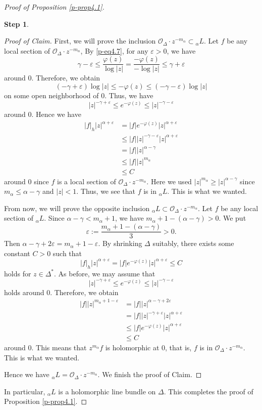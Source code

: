 \documentclass[12pt,twoside]{amsart}
\theoremstyle{definition}
\newtheorem{step}{Step}
\begin{document}
\begin{proof}[Proof of Proposition \ref{p-prop4.1}]
\begin{step}
\begin{proof}[Proof of Claim]
First, we will prove the inclusion $\mathcal O_\Delta\cdot z^{-m_\alpha} \subset 
{}_\alpha L$. 
Let $f$ be any local section of $\mathcal O_\Delta\cdot z^{-m_\alpha}$, 
By \eqref{p-eq4.7}, for any $\varepsilon >0$, 
we have 
\[
\gamma -\varepsilon \leq \frac{\varphi(z)}{\log |z|} =
\frac{-\varphi(z)}{-\log |z|} \leq \gamma +\varepsilon 
\] 
around $0$. 
Therefore, we obtain 
\[
(-\gamma +\varepsilon) \log |z| \leq -\varphi(z) 
\leq (-\gamma -\varepsilon) \log |z|
\] 
on some open neighborhood of $0$. 
Thus, we have 
\[
|z|^{-\gamma +\varepsilon} \leq e^{-\varphi(z)} \leq |z|^{-\gamma -\varepsilon}
\] 
around $0$. 
Hence we have 
\[
\begin{split}
|f|_h |z|^{\alpha +\varepsilon} &=|f| e^{-\varphi(z)} |z|^{\alpha +\varepsilon} 
\\ & \leq |f| |z|^{-\gamma -\varepsilon} |z| ^{\alpha +\varepsilon} \\ 
&= |f| |z|^{\alpha -\gamma} \\ 
&\leq |f| |z|^{m_\alpha} \\&\leq C
\end{split} 
\] 
around $0$ since $f$ is a local section of $\mathcal O_\Delta\cdot 
z^{-m_\alpha}$. Here we used 
$|z|^{m_\alpha} \geq |z|^{\alpha -\gamma}$ since $m_\alpha 
\leq \alpha -\gamma$ and $|z|<1$. 
Thus, we see that $f$ is in ${}_\alpha L$. This is what we wanted. 

From now, we will prove the opposite inclusion 
${}_\alpha L\subset \mathcal O_\Delta\cdot z^{-m_\alpha}$. 
Let $f$ be any local section of ${}_\alpha L$. 
Since $\alpha -\gamma <m_\alpha +1$, 
we have 
$m_\alpha +1-(\alpha -\gamma) >0$. We put 
\[
\varepsilon :=\frac{m_\alpha +1-(\alpha -\gamma)}{3}>0. 
\] 
Then $\alpha -\gamma +2\varepsilon =m_\alpha +1-\varepsilon$. 
By shrinking $\Delta$ suitably, 
there exists some constant $C>0$ such that 
\[
|f|_h |z|^{\alpha +\varepsilon} =|f|e^{-\varphi(z)} |z|^{\alpha +\varepsilon} 
\leq C 
\] 
holds for $z\in \Delta^*$. As before, 
we may assume that 
\[
|z|^{-\gamma +\varepsilon} \leq e^{-\varphi(z)} 
\leq |z|^{-\gamma -\varepsilon}
\] 
holds around $0$. 
Therefore, we obtain 
\[
\begin{split}
|f| |z|^{m_\alpha +1-\varepsilon} &= |f| |z|^{\alpha -\gamma +2\varepsilon} \\ 
&=|f| |z|^{-\gamma +\varepsilon} |z| ^{\alpha +\varepsilon} 
\\ 
&\leq |f| e^{-\varphi(z)} |z|^{\alpha +\varepsilon} \\ 
&\leq C 
\end{split}
\] 
around $0$. 
This means that $z^{m_\alpha}f$ is holomorphic at $0$, that is, 
$f$ is in $\mathcal O_\Delta \cdot z^{-m_\alpha}$. 
This is what we wanted. 

Hence we have ${}_\alpha L=\mathcal O_\Delta\cdot z^{-m_\alpha}$. 
We finish the proof of Claim. 
\end{proof}
\end{step}
In particular, ${}_\alpha L$ is a holomorphic line bundle 
on $\Delta$. 
This completes the proof of Proposition \ref{p-prop4.1}. 
\end{proof}
\end{document}
